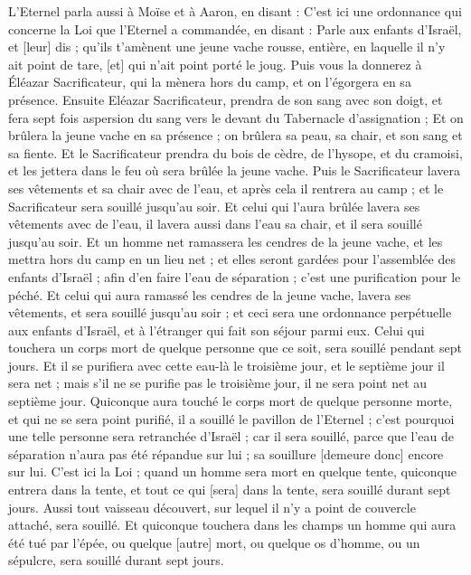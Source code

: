 \begin{multicols}{2}
\VerseOne{}L'Eternel parla aussi à Moïse et à Aaron, en disant :
C'est ici une ordonnance qui concerne la Loi que l'Eternel a commandée, en disant : Parle aux enfants d'Israël, et [leur] dis ; qu'ils t'amènent une jeune vache rousse, entière, en laquelle il n'y ait point de tare, [et] qui n'ait point porté le joug.
Puis vous la donnerez à Éléazar Sacrificateur, qui la mènera hors du camp, et on l'égorgera en sa présence.
Ensuite Eléazar Sacrificateur, prendra de son sang avec son doigt, et fera sept fois aspersion du sang vers le devant du Tabernacle d'assignation ;
Et on brûlera la jeune vache en sa présence ; on brûlera sa peau, sa chair, et son sang et sa fiente.
Et le Sacrificateur prendra du bois de cèdre, de l'hysope, et du cramoisi, et les jettera dans le feu où sera brûlée la jeune vache.
Puis le Sacrificateur lavera ses vêtements et sa chair avec de l'eau, et après cela il rentrera au camp ; et le Sacrificateur sera souillé jusqu'au soir.
Et celui qui l'aura brûlée lavera ses vêtements avec de l'eau, il lavera aussi dans l'eau sa chair, et il sera souillé jusqu'au soir.
Et un homme net ramassera les cendres de la jeune vache, et les mettra hors du camp en un lieu net ; et elles seront gardées pour l'assemblée des enfants d'Israël ; afin d'en faire l'eau de séparation ; c'est une purification pour le péché.
Et celui qui aura ramassé les cendres de la jeune vache, lavera ses vêtements, et sera souillé jusqu'au soir ; et ceci sera une ordonnance perpétuelle aux enfants d'Israël, et à l'étranger qui fait son séjour parmi eux.
Celui qui touchera un corps mort de quelque personne que ce soit, sera souillé pendant sept jours.
Et il se purifiera avec cette eau-là le troisième jour, et le septième jour il sera net ; mais s'il ne se purifie pas le troisième jour, il ne sera point net au septième jour.
Quiconque aura touché le corps mort de quelque personne morte, et qui ne se sera point purifié, il a souillé le pavillon de l'Eternel ; c'est pourquoi une telle personne sera retranchée d'Israël ; car il sera souillé, parce que l'eau de séparation n'aura pas été répandue sur lui ; sa souillure [demeure donc] encore sur lui.
C'est ici la Loi ; quand un homme sera mort en quelque tente, quiconque entrera dans la tente, et tout ce qui [sera] dans la tente, sera souillé durant sept jours.
Aussi tout vaisseau découvert, sur lequel il n'y a point de couvercle attaché, sera souillé.
Et quiconque touchera dans les champs un homme qui aura été tué par l'épée, ou quelque [autre] mort, ou quelque os d'homme, ou un sépulcre, sera souillé durant sept jours.

\end{multicols}
